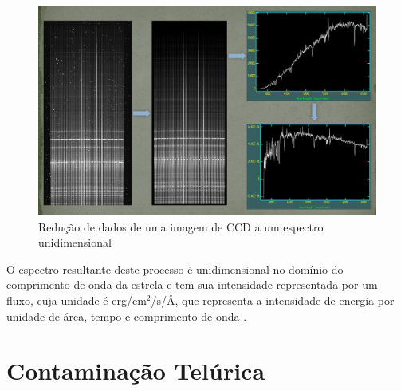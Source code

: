
\begin{figure}[htb]
\centering
\includegraphics[width=15cm]{figuras/calibration_steps.jpg}
\caption{Redução de dados de uma imagem de CCD a um espectro unidimensional \citep{data-reduction-image}}
\label{fig:calibration-steps}
\end{figure}

O espectro resultante deste processo é unidimensional no domínio do comprimento de onda da estrela e tem sua intensidade representada por um fluxo, cuja unidade é erg/cm\(^{2}\)/s/Å, que representa a intensidade de energia por unidade de área, tempo e comprimento de onda \citep{astronomical-measurements}.





\section{Contaminação Telúrica} \label{telluric-contamination}

